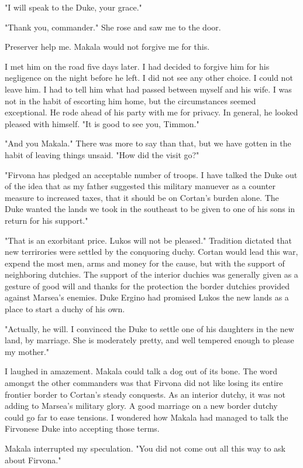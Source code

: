\documentclass{article}
\begin{document}
"I will speak to the Duke, your grace."

"Thank you, commander." She rose and saw me to the door. 

Preserver help me. Makala would not forgive me for this.

I met him on the road  five days later. I had decided to forgive him for his negligence on the night before he left. I did not see any other choice. I could not leave him. I had to tell him what had passed between myself and his wife. I was not in the habit of escorting him home, but the circumstances seemed exceptional. He rode ahead of his party with me for privacy. In general, he looked pleased with himself. "It is good to see you, Timmon."

"And you Makala." There was more to say than that, but we have gotten in the habit of leaving things unsaid. "How did the visit go?"

"Firvona has pledged an acceptable number of troops. I have talked the Duke out of the idea that as my father suggested this military manuever as a counter measure to increased taxes, that it should be on Cortan's burden alone. The Duke wanted the lands we took in the southeast to be given to one of his sons in return for his support."

"That is an exorbitant price. Lukos will not be pleased." Tradition dictated that new terrirories were settled by the conquoring duchy. Cortan would lead this war, expend the most men, arms and money for the cause, but with the support of neighboring dutchies. The support of the interior duchies was generally given as a gesture of good will and thanks for the protection the border dutchies provided against Marsea's enemies. Duke Ergino had promised Lukos the new lands as a place to start a duchy of his own.

"Actually, he will. I convinced the Duke to settle one of his daughters in the new land, by marriage. She is moderately pretty, and well tempered enough to please my mother."

I laughed in amazement. Makala could talk a dog out of its bone. The word amongst the other commanders was that Firvona did not like losing its entire frontier border to Cortan's steady conquests. As an interior dutchy, it was not adding to Marsea's military glory. A good marriage on a new border dutchy could go far to ease tensions. I wondered how Makala had managed to talk the Firvonese Duke into accepting those terms.

Makala interrupted my speculation. "You did not come out all this way to ask about Firvona."
\end{document}
